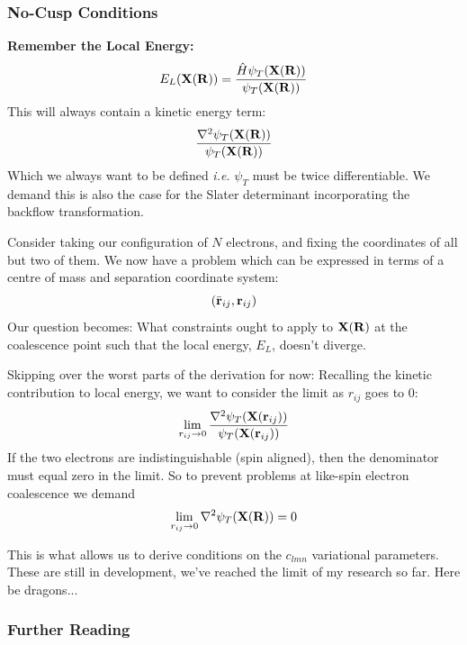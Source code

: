 \documentclass[10pt]{beamer}
\begin{document}
\begin{frame}[allowframebreaks]
    \frametitle{No-Cusp Conditions}
    \textbf{Remember the Local Energy:}
    \begin{equation}
        E_L\pqty{\vb{X}\pqty{\vb{R}}}=\frac{%
            \hat{H}\psi_T\pqty{\vb{X}\pqty{\vb{R}}}
        }{%
            \psi_T\pqty{\vb{X}\pqty{\vb{R}}}
        }
    \end{equation}
    This will always contain a kinetic energy term:
    \begin{equation}
        \frac{%
            \laplacian\psi_T\pqty{\vb{X}\pqty{\vb{R}}}
        }{%
            \psi_T\pqty{\vb{X}\pqty{\vb{R}}}
        }
    \end{equation}
    Which we always want to be defined \textit{i.e.} $\psi_T$ must be twice
    differentiable. We demand this is also the case for the Slater determinant
    incorporating the backflow transformation.
    \framebreak

    Consider taking our configuration of $N$ electrons, and fixing the
    coordinates of all but two of them. We now have a problem which can be
    expressed in terms of a centre of mass and separation coordinate system:
    \begin{equation*}
        \pqty{\bar{\vb{r}}_{ij},\vb{r}_{ij}}
    \end{equation*}
    Our question becomes: What constraints ought to apply to
    $\vb{X}\pqty{\vb{R}}$ at the coalescence point such that the local energy,
    $E_L$, doesn't diverge.
    \framebreak

    Skipping over the worst parts of the derivation for now:\newline
    Recalling the kinetic contribution to local energy, we want to consider
    the limit as $r_{ij}$ goes to $0$:
    \begin{equation}
        \lim\limits_{r_{ij}\to 0}\frac{
            \laplacian\psi_T\pqty{\vb{X}\pqty{\vb{r}_{ij}}}
        }{
            \psi_T\pqty{\vb{X}\pqty{\vb{r}_{ij}}}
        }
    \end{equation}
    If the two electrons are indistinguishable (spin aligned), then the
    denominator must equal zero in the limit.\medskip\newline
    So to prevent problems at like-spin electron coalescence we demand
    \begin{equation}
        \lim\limits_{r_{ij}\to 0}\laplacian\psi_T\pqty{\vb{X}\pqty{\vb{R}}}=0
    \end{equation}
    \framebreak

    This is what allows us to derive conditions on the $c_{lmn}$ variational
    parameters. These are still in development, we've reached the limit of my
    research so far.\medskip\newline
    Here be dragons...
\end{frame}


\begin{frame}[allowframebreaks]
    \frametitle{Further Reading}
    
    

\end{frame}
\end{document}
